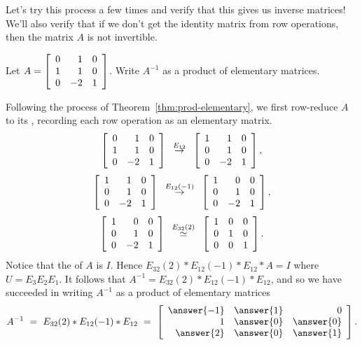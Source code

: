 \documentclass{ximera}
\begin{document}
Let's try this process a few times and verify that this gives us inverse matrices! We'll also verify that if we don't get the identity matrix from row operations, then the matrix $A$ is not invertible.

\begin{example}\label{ex:prod-elementary}
  Let $A = \startmat{rrr}
    0 &  1 & 0 \\
    1 &  1 & 0 \\
    0 & -2 & 1
  \stopmat$.
  Write $A^{-1}$ as a product of elementary matrices.
\end{example}

\begin{solution}
  Following the process of Theorem~\ref{thm:prod-elementary}, we first
  row-reduce $A$ to its {\rref}, recording each row operation as an
  elementary matrix.
  \begin{equation*}
    \startmat{rrr}
      0 & 1 & 0 \\
      1 & 1 & 0 \\
      0 & -2 & 1 \\
    \stopmat
    \quad\stackrel{E_{12}}{\rightarrow}\quad
    \startmat{rrr}
      1 & 1 & 0 \\
      0 & 1 & 0 \\
      0 & -2 & 1 \\
    \stopmat,
  \end{equation*}
  \begin{equation*}
    \startmat{rrr}
      1 & 1 & 0 \\
      0 & 1 & 0 \\
      0 & -2 & 1 \\
    \stopmat
    \quad\stackrel{E_{12}(-1)}{\rightarrow}\quad
    \startmat{rrr}
      1 & 0 & 0 \\
      0 & 1 & 0 \\
      0 & -2 & 1 \\
    \stopmat,
  \end{equation*}
  \begin{equation*}
    \startmat{rrr}
      1 & 0 & 0 \\
      0 & 1 & 0 \\
      0 & -2 & 1 \\
    \stopmat
    \quad\stackrel{E_{32}(2)}{\roweq}\quad
    \startmat{rrr}
      1 & 0 & 0 \\
      0 & 1 & 0 \\
      0 & 0 & 1 \\
    \stopmat.
  \end{equation*}
  Notice that the {\rref} of $A$ is $I$. Hence $E_{32}(2)*E_{12}(-1)*E_{12}*A=I$ where
  $U=E_3E_2E_1$. It follows that
  $A^{-1} = E_{32}(2)*E_{12}(-1)*E_{12}$, and so we have succeeded in
  writing $A^{-1}$ as a product of elementary matrices
  \begin{equation*}
    A^{-1}
    ~=~ E_{32}(2)*E_{12}(-1)*E_{12}
    ~=~
    \startmat{rrr}
      \answer{-1}&\answer{1}&0\\
      1&\answer{0}&\answer{0}\\
      \answer{2}&\answer{0}&\answer{1}
    \stopmat.
  \end{equation*}
\end{solution}
\end{document}
